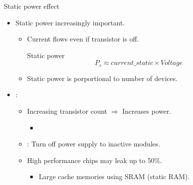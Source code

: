 \begin{frame}[t]{Static power effect}
\begin{itemize}
  \item Static power increasingly important.
    \begin{itemize}
      \item Current flows even if transistor is off.

\pause
\begin{block}{Static power}
\begin{displaymath}
P_s \approx current\_{static} \times Voltage
\end{displaymath}
\end{block}

      \pause
      \item Static power is porportional to number of devices.
    \end{itemize}

  \item {}:
    \begin{itemize}
      \item Increasing transistor count $\Rightarrow$ Increases power.
        \begin{itemize}
          \item {}
        \end{itemize}

      \pause
      \item {}: Turn off power supply to inactive modules.

      \pause
      \item High performance chips may leak up to 50\%.
        \begin{itemize}
          \item Large cache memories using SRAM (static RAM).
        \end{itemize}
    \end{itemize}
\end{itemize}
\end{frame}
